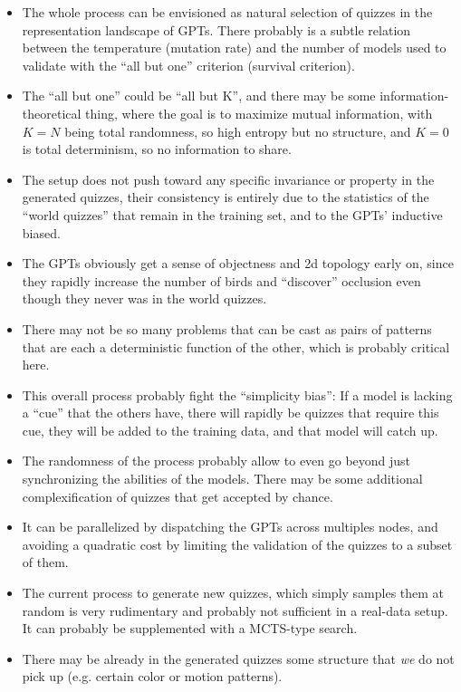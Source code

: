 \documentclass[11pt,a4paper,oneside]{article}
\begin{document}
\begin{itemize}

\item The whole process can be envisioned as natural selection of
  quizzes in the representation landscape of GPTs. There probably is a
  subtle relation between the temperature (mutation rate) and the
  number of models used to validate with the ``all but one'' criterion
  (survival criterion).

\item The ``all but one'' could be ``all but K'', and there may be
  some information-theoretical thing, where the goal is to maximize
  mutual information, with $K=N$ being total randomness, so high
  entropy but no structure, and $K=0$ is total determinism, so no
  information to share.

\item The setup does not push toward any specific invariance or
  property in the generated quizzes, their consistency is entirely due
  to the statistics of the ``world quizzes'' that remain in the
  training set, and to the GPTs' inductive biased.

\item The GPTs obviously get a sense of objectness and 2d topology
  early on, since they rapidly increase the number of birds and
  ``discover'' occlusion even though they never was in the world
  quizzes.

\item There may not be so many problems that can be cast as pairs of
  patterns that are each a deterministic function of the other, which
  is probably critical here.

\item This overall process probably fight the ``simplicity bias'': If
  a model is lacking a ``cue'' that the others have, there will
  rapidly be quizzes that require this cue, they will be added to the
  training data, and that model will catch up.

\item The randomness of the process probably allow to even go beyond
  just synchronizing the abilities of the models. There may be some
  additional complexification of quizzes that get accepted by chance.

\item It can be parallelized by dispatching the GPTs across multiples
  nodes, and avoiding a quadratic cost by limiting the validation of
  the quizzes to a subset of them.

\item The current process to generate new quizzes, which simply
  samples them at random is very rudimentary and probably not
  sufficient in a real-data setup. It can probably be supplemented
  with a MCTS-type search.

\item There may be already in the generated quizzes some structure
  that \emph{we} do not pick up (e.g. certain color or motion
  patterns).

\end{itemize}
\end{document}
